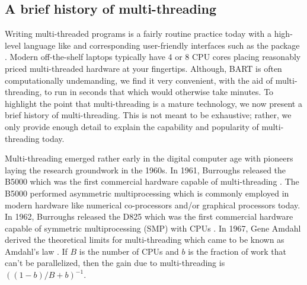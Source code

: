 \documentclass[article]{jss}
\begin{document}
\subsection{A brief history of multi-threading}

Writing multi-threaded programs is a fairly routine practice today
with a high-level language like  and corresponding
user-friendly interfaces such as the   package
\citep{RCor18}.  Modern off-the-shelf laptops typically have 4 or
8 CPU cores placing reasonably priced multi-threaded hardware at your
fingertips.  Although, BART is often computationally undemanding, we
find it very convenient, with the aid of multi-threading, to run in
seconds that which would otherwise take minutes.  To highlight the
point that multi-threading is a mature technology, we now present a
brief history of multi-threading.  This is not meant to be exhaustive;
rather, we only provide enough detail to explain the capability and
popularity of multi-threading today.

Multi-threading
emerged rather early in the digital computer age with pioneers laying the
research groundwork in the 1960s.  In 1961, Burroughs released
the B5000 which was the first commercial hardware capable of
multi-threading \citep{Lync65}.  The B5000 performed asymmetric
multiprocessing which is commonly employed in modern hardware like
numerical co-processors and/or graphical processors today.  In 1962,
Burroughs released the D825 which was the first commercial hardware
capable of symmetric multiprocessing (SMP) with CPUs
\citep{AndeHoff62}.  In 1967, Gene Amdahl derived the theoretical
limits for multi-threading which came to be known as Amdahl's law
\citep{Amda67}.  If $B$ is the number of CPUs and $b$ is the fraction
of work that can't be parallelized, then the gain due to
multi-threading is $((1-b)/B+b)^{-1}$.
\end{document}
